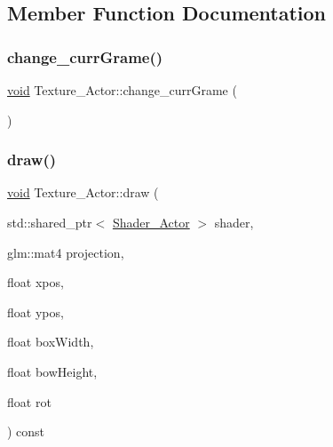 \subsection{Member Function Documentation}
\mbox{\label{classTexture__Actor_a06b9398ac62bf0f55e9090d76a6cb032}} 
\subsubsection{\texorpdfstring{change\+\_\+curr\+Grame()}{change\_currGrame()}}
{\footnotesize\ttfamily \hyperlink{imgui__impl__opengl3__loader_8h_ac668e7cffd9e2e9cfee428b9b2f34fa7}{void} Texture\+\_\+\+Actor\+::change\+\_\+curr\+Grame (\begin{DoxyParamCaption}{ }\end{DoxyParamCaption})\hspace{0.3cm}{\ttfamily [inline]}}

\mbox{\label{classTexture__Actor_a56b306a93f7f91e3f8a51284b9077446}} 
\subsubsection{\texorpdfstring{draw()}{draw()}\hspace{0.1cm}{\footnotesize\ttfamily [1/2]}}
{\footnotesize\ttfamily \hyperlink{imgui__impl__opengl3__loader_8h_ac668e7cffd9e2e9cfee428b9b2f34fa7}{void} Texture\+\_\+\+Actor\+::draw (\begin{DoxyParamCaption}\item[{std\+::shared\+\_\+ptr$<$ \hyperlink{classShader__Actor}{Shader\+\_\+\+Actor} $>$}]{shader,  }\item[{glm\+::mat4}]{projection,  }\item[{float}]{xpos,  }\item[{float}]{ypos,  }\item[{float}]{box\+Width,  }\item[{float}]{bow\+Height,  }\item[{float}]{rot }\end{DoxyParamCaption}) const}


